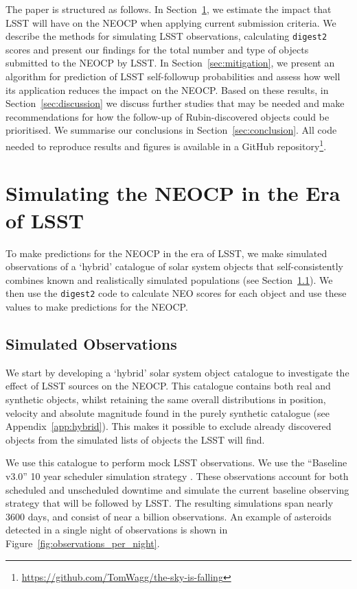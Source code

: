 \documentclass[twocolumn]{aastex631}
\newcommand{\dig}{\texttt{digest2}}
\begin{document}
The paper is structured as follows. In Section~\ref{sec:current_impact}, we estimate the impact that LSST will have on the NEOCP when applying current submission criteria. We describe the methods for simulating LSST observations, calculating \dig{} scores and present our findings for the total number and type of objects submitted to the NEOCP by LSST. In Section~\ref{sec:mitigation}, we present an algorithm for prediction of LSST self-followup probabilities and assess how well its application reduces the impact on the NEOCP. Based on these results, in Section~\ref{sec:discussion} we discuss further studies that may be needed and make recommendations for how the follow-up of Rubin-discovered objects could be prioritised. We summarise our conclusions in Section~\ref{sec:conclusion}. All code needed to reproduce results and figures is available in a GitHub repository\footnote{\url{https://github.com/TomWagg/the-sky-is-falling}}.

\section{Simulating the NEOCP in the Era of LSST}\label{sec:current_impact}
To make predictions for the NEOCP in the era of LSST, we make simulated observations of a `hybrid' catalogue of solar system objects that self-consistently combines known and realistically simulated populations (see Section~\ref{sec:sim_obs}). We then use the \dig{} code to calculate NEO scores for each object and use these values to make predictions for the NEOCP.

\subsection{Simulated Observations}\label{sec:sim_obs}
We start by developing a `hybrid' solar system object catalogue to investigate the effect of LSST sources on the NEOCP. This catalogue contains both real and synthetic objects, whilst retaining the same overall distributions in position, velocity and absolute magnitude found in the purely synthetic catalogue (see Appendix~\ref{app:hybrid}). This makes it possible to exclude already discovered objects from the simulated lists of objects the LSST will find.

We use this catalogue to perform mock LSST observations. We use the ``Baseline v3.0'' 10 year scheduler simulation strategy \citep{Naghib+2019, Cornwall+2020}. These observations account for both scheduled and unscheduled downtime and simulate the current baseline observing strategy that will be followed by LSST. The resulting simulations span nearly 3600 days, and consist of near a billion observations. An example of asteroids detected in a single night of observations is shown in Figure~\ref{fig:observations_per_night}.
\end{document}
